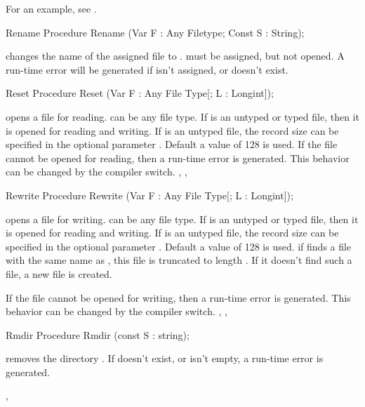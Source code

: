 \documentclass{report}
\begin{document}
For an example, see .
\begin{procedure}{Rename}
\Declaration
Procedure Rename (Var F : Any Filetype; Const S : String);

\Description
{} changes the name of the assigned file  to .
must be assigned, but not opened.
\Errors
A run-time error will be generated if  isn't assigned,
or doesn't exist.
\SeeAlso
{}
\end{procedure}
\html{}
\begin{procedure}{Reset}
\Declaration
Procedure Reset (Var F : Any File Type[; L : Longint]);

\Description
{} opens a file  for reading.  can be any file type.
If  is an untyped or typed file, then it is opened for reading and
writing. If  is an untyped file, the record size can be specified in
the optional parameter . Default a value of 128 is used.
\Errors
If the file cannot be opened for reading, then a run-time error is
generated. This behavior can be changed by the  compiler switch.
\SeeAlso
{}, , 
\end{procedure}
\html{}
\begin{procedure}{Rewrite}
\Declaration
Procedure Rewrite (Var F : Any File Type[; L : Longint]);

\Description
{} opens a file  for writing.  can be any file type.
If  is an untyped or typed file, then it is opened for reading and
writing. If  is an untyped file, the record size can be specified in
the optional parameter . Default a value of 128 is used.
if  finds a file with the same name as , this file is
truncated to length . If it doesn't find such a file, a new file is
created.

\Errors
If the file cannot be opened for writing, then a run-time error is
generated. This behavior can be changed by the  compiler switch.
\SeeAlso
{}, , 
\end{procedure}
\html{}
\begin{procedure}{Rmdir}
\Declaration
Procedure Rmdir (const S : string);

\Description
{} removes the  directory .
\Errors
If  doesn't exist, or isn't empty, a run-time error is generated.

\SeeAlso
{}, 
\end{procedure}
\end{document}
